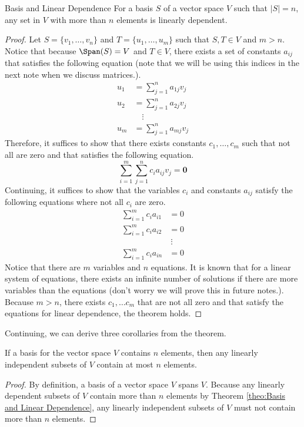 \documentclass[../main.tex]{subfiles}
\begin{document}
\begin{theorem}{Basis and Linear Dependence}
For a basis $S$ of a vector space $V$ such that $|S| = n$, any set
in $V$ with more than $n$ elements is linearly dependent.
\end{theorem}
\begin{proof}
Let $S = \{ v_1, \ldots, v_n \}$ and $T = \{ u_1, \ldots, u_m \}$
such that $S, T \in V$ and $m > n$. Notice that because $\Span(S) = V$
and $T \in V$, there exists a set of constants $a_{ij}$ that satisfies
the following equation (note that we will be using this indices in
the next note when we discuss matrices.).
\begin{align*}
    u_1 &= \sum_{j=1}^n a_{1j} v_j \\
    u_2 &= \sum_{j=1}^n a_{2j} v_j \\
    &\quad\vdots \\
    u_m &= \sum_{j=1}^n a_{mj} v_j
\end{align*}
Therefore, it suffices to show that there exists constants $c_1,
\ldots, c_m$ such that not all are zero and that satisfies the
following equation.
\[
\sum_{i=1}^m \sum_{j=1}^n c_i a_{ij} v_j
= \mathbf{0}
\]
Continuing, it suffices to show that the variables $c_i$ and constants
$a_{ij}$ satisfy the following equations where not all $c_i$ are zero.
\begin{align*}
    \sum_{i=1}^m c_i a_{i1} &= 0 \\
    \sum_{i=1}^m c_i a_{i2} &= 0 \\
    &\ \vdots \\
    \sum_{i=1}^m c_i a_{in} &= 0
\end{align*}
Notice that there are $m$ variables and $n$ equations. It is known
that for a linear system of equations, there exists an infinite number
of solutions if there are more variables than the equations (don't
worry we will prove this in future notes.). Because $m > n$, there
exists $c_1, \ldots c_m$ that are not all zero and that satisfy the
equations for linear dependence, the theorem holds.
\end{proof}

Continuing, we can derive three corollaries from the theorem.

\begin{corollary}{}
If a basis for the vector space $V$ contains $n$ elements, then any
linearly independent subsets of $V$ contain at most $n$ elements.
\end{corollary}
\begin{proof}
By definition, a basis of a vector space $V$ spans $V$. Because any
linearly dependent subsets of $V$ contain more than $n$ elements
by Theorem \ref{theo:Basis and Linear Dependence}, any linearly
independent subsets of $V$ must not contain more than $n$ elements.
\end{proof}
\end{document}
